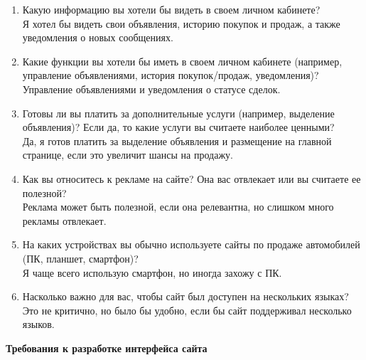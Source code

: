 \begin{enumerate}
    \item Какую информацию вы хотели бы видеть в своем личном кабинете?\\
        Я хотел бы видеть свои объявления, историю покупок и продаж, а также уведомления о новых сообщениях.
    \item Какие функции вы хотели бы иметь в своем личном кабинете (например, управление объявлениями, история покупок/продаж, уведомления)?\\
        Управление объявлениями и уведомления о статусе сделок.
    \item Готовы ли вы платить за дополнительные услуги (например, выделение объявления)? Если да, то какие услуги вы считаете наиболее ценными?\\
        Да, я готов платить за выделение объявления и размещение на главной странице, если это увеличит шансы на продажу.
    \item Как вы относитесь к рекламе на сайте? Она вас отвлекает или вы считаете ее полезной?\\
        Реклама может быть полезной, если она релевантна, но слишком много рекламы отвлекает.
    \item На каких устройствах вы обычно используете сайты по продаже автомобилей (ПК, планшет, смартфон)?\\
        Я чаще всего использую смартфон, но иногда захожу с ПК.
    \item Насколько важно для вас, чтобы сайт был доступен на нескольких языках?\\
        Это не критично, но было бы удобно, если бы сайт поддерживал несколько языков.
\end{enumerate}
\bigskip

\textbf{Требования к разработке интерфейса сайта}
\bigskip

